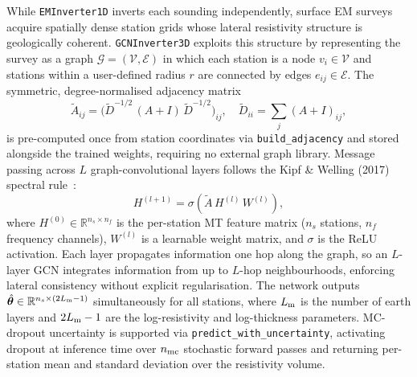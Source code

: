 \documentclass[review,12pt]{elsarticle}
\begin{document}
While \texttt{EMInverter1D} inverts each sounding independently,
surface EM surveys acquire spatially dense station grids whose lateral
resistivity structure is geologically coherent.
\texttt{GCNInverter3D} exploits this structure by representing the survey
as a graph $\mathcal{G}=(\mathcal{V},\mathcal{E})$ in which each station is a
node $v_i\in\mathcal{V}$ and stations within a user-defined radius $r$ are
connected by edges $e_{ij}\in\mathcal{E}$.
The symmetric, degree-normalised adjacency matrix
\begin{equation}
  \tilde{A}_{ij} = \bigl(\tilde{D}^{-1/2}\,(\!A+I)\,\tilde{D}^{-1/2}\bigr)_{ij},
  \quad \tilde{D}_{ii} = \sum_j (A+I)_{ij},
  \label{eq:gcnnorm}
\end{equation}
is pre-computed once from station coordinates via \texttt{build\_adjacency}
and stored alongside the trained weights, requiring no external graph
library.
Message passing across $L$ graph-convolutional layers follows
the Kipf \& Welling (2017) spectral rule~\citep{Kipf2017}:
\begin{equation}
  H^{(l+1)} = \sigma\!\left(
    \tilde{A}\,H^{(l)}\,W^{(l)}
  \right),
  \label{eq:gcnlayer}
\end{equation}
where $H^{(0)}\in\mathbb{R}^{n_s\times n_f}$ is the per-station MT feature
matrix ($n_s$ stations, $n_f$ frequency channels), $W^{(l)}$ is a learnable
weight matrix, and $\sigma$ is the ReLU activation.
Each layer propagates information one hop along the graph, so an
$L$-layer GCN integrates information from up to $L$-hop neighbourhoods,
enforcing lateral consistency without explicit regularisation.
The network outputs $\hat{\boldsymbol\theta}\in\mathbb{R}^{n_s\times(2L_{\rm m}-1)}$
simultaneously for all stations, where $L_{\rm m}$ is the number of earth
layers and $2L_{\rm m}-1$ are the log-resistivity and log-thickness
parameters.
MC-dropout uncertainty is supported via \texttt{predict\_with\_uncertainty},
activating dropout at inference time over $n_{\rm mc}$ stochastic forward
passes and returning per-station mean and standard deviation over the
resistivity volume.
\end{document}
